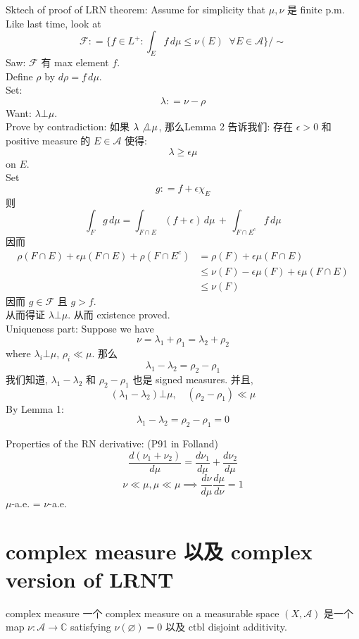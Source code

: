 \documentclass[lang=cn,11pt]{elegantbook}
\begin{document}
Sktech of proof of LRN theorem: 
Assume for simplicity that $\mu,\nu$ 是 finite p.m.\\
Like last time, look at \[
\mathcal{F} : =  \{f\in L^+ : \int_E f\, d\mu \leq \nu(E) \;\; \forall E\in\mathcal{A}  \} / \sim
\]
Saw: $\mathcal{F} $ 有 max element $f$.\\
Define $\rho$ by $d \rho = f \, d \mu$.\\
Set: \[
\lambda : = \nu - \rho
\]
Want: $\lambda \bot \mu$.\\
Prove by contradiction: 如果 $\lambda \not \bot \mu$, 那么Lemma 2 告诉我们: 存在 $\epsilon > 0$ 和 positive measure 的 $E \in \mathcal{A}$ 使得: \[
\lambda \geq \epsilon \mu
\]
on $E$.\\
Set \[
g: = f + \epsilon\chi_E 
\]
则 \[
\int_F g \, d\mu = \int_{F \cap E} (f + \epsilon)\, d\mu \, + \, \int_{F \cap E^c} f \, d\mu
 \]
因而 \begin{align*}
    \rho (F \cap E)  + \epsilon \mu (F \cap E) + \rho (F \cap E^c) &= \rho(F) + \epsilon \mu(F \cap E) \\
    &\leq \nu(F) - \epsilon \mu(F)  + \epsilon \mu (F\cap E) \\
    &\leq \nu(F)
\end{align*} 
因而 $g \in \mathcal{F}$ 且 $g > f$.\\
从而得证 $\lambda \bot \mu$. 从而 existence proved.\\
Uniqueness part: Suppose we have \[
\nu = \lambda_1 + \rho_1 = \lambda_2 + \rho_2
\]
where $\lambda_i \bot \mu$, $\rho_i \ll \mu$.
那么 \[
\lambda_1  - \lambda_2 =  \rho_2 - \rho_1
\]
我们知道, $\lambda_1  - \lambda_2 $ 和 $ \rho_2 - \rho_1$ 也是 signed measures. 并且, 
\[
(\lambda_1  - \lambda_2) \bot \mu ,\quad ( \rho_2 - \rho_1) \ll \mu 
\]
By Lemma 1: \[
\lambda_1  - \lambda_2 =  \rho_2 - \rho_1 = 0
\]





Properties of the RN derivative:
(P91 in Folland)
\[
\frac{d(\nu_1 + \nu_2)}{d \mu} = \frac{d \nu_1}{d\mu} + \frac{d\nu_2}{d \mu}
\]
\[
\nu \ll \mu ,\mu \ll \mu \implies \frac{d\nu}{d\mu} \frac{d\mu}{d\nu}  = 1
\]
$\mu$-a.e. = $\nu$-a.e.






\section{complex measure 以及 complex version of LRNT}

\begin{definition}{complex measure}
    一个 complex measure on a measurable space $(X,\mathcal{A})$ 是一个 map $\nu: \mathcal{A} \to \mathbb{C}$ satisfying $\nu(\varnothing) = 0$ 以及 ctbl disjoint additivity.
\end{definition}
\end{document}
